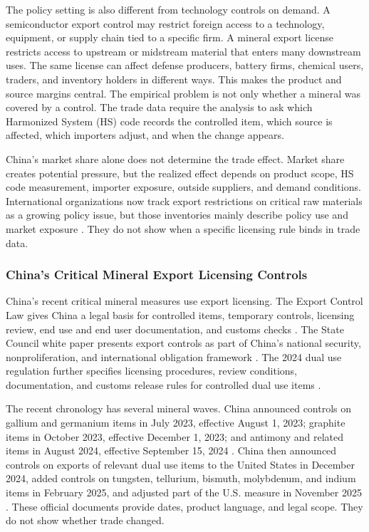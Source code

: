 \documentclass[12pt,a4paper]{article}
\numberwithin{equation}{section}
\begin{document}
The policy setting is also different from technology controls on demand. A semiconductor export control may restrict foreign access to a technology, equipment, or supply chain tied to a specific firm. A mineral export license restricts access to upstream or midstream material that enters many downstream uses. The same license can affect defense producers, battery firms, chemical users, traders, and inventory holders in different ways. This makes the product and source margins central. The empirical problem is not only whether a mineral was covered by a control. The trade data require the analysis to ask which Harmonized System (HS) code records the controlled item, which source is affected, which importers adjust, and when the change appears.

China's market share alone does not determine the trade effect. Market share creates potential pressure, but the realized effect depends on product scope, HS code measurement, importer exposure, outside suppliers, and demand conditions. International organizations now track export restrictions on critical raw materials as a growing policy issue, but those inventories mainly describe policy use and market exposure \citep{oecd2026_crm_export_restrictions,iea_2025_global_critical_minerals_outlook}. They do not show when a specific licensing rule binds in trade data.

\subsubsection{China's Critical Mineral Export Licensing Controls}

China's recent critical mineral measures use export licensing. The Export Control Law gives China a legal basis for controlled items, temporary controls, licensing review, end use and end user documentation, and customs checks \citep{prc_2020_export_control_law}. The State Council white paper presents export controls as part of China's national security, nonproliferation, and international obligation framework \citep{scio_2021_chinas_export_controls}. The 2024 dual use regulation further specifies licensing procedures, review conditions, documentation, and customs release rules for controlled dual use items \citep{prc2024_dual_use_regulations}.

The recent chronology has several mineral waves. China announced controls on gallium and germanium items in July 2023, effective August 1, 2023; graphite items in October 2023, effective December 1, 2023; and antimony and related items in August 2024, effective September 15, 2024 \citep{mofcom_2023_gallium_germanium_controls,mofcom_2023_graphite_controls,mofcom_2024_antimony_controls}. China then announced controls on exports of relevant dual use items to the United States in December 2024, added controls on tungsten, tellurium, bismuth, molybdenum, and indium items in February 2025, and adjusted part of the U.S. measure in November 2025 \citep{mofcom_2024_us_controls_critical_minerals,mofcom_2025_w_te_bi_mo_in_controls,mofcom_2025_suspend_us_controls_art2}. These official documents provide dates, product language, and legal scope. They do not show whether trade changed.
\end{document}
